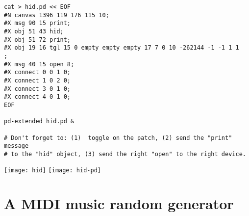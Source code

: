 \begin{enumerate}
\begin{verbatim}
cat > hid.pd << EOF
#N canvas 1396 119 176 115 10;
#X msg 90 15 print;
#X obj 51 43 hid;
#X obj 51 72 print;
#X obj 19 16 tgl 15 0 empty empty empty 17 7 0 10 -262144 -1 -1 1 1
;
#X msg 40 15 open 8;
#X connect 0 0 1 0;
#X connect 1 0 2 0;
#X connect 3 0 1 0;
#X connect 4 0 1 0;
EOF

pd-extended hid.pd &

# Don't forget to: (1)  toggle on the patch, (2) send the "print" message
# to the "hid" object, (3) send the right "open" to the right device.
\end{verbatim}

\begin{center}
  \texttt{[image: hid]}
  \texttt{[image: hid-pd]}
\end{center}

\end{enumerate}


\section{A MIDI music random generator}

